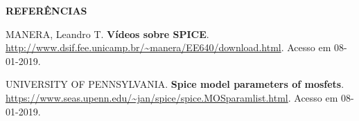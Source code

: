 \documentclass[addpoints]{exam}
\begin{document}
\begin{questions}
\vspace{5mm}

\textbf{REFERÊNCIAS}

\vspace{5mm}

MANERA, Leandro T. \textbf{Vídeos sobre SPICE}. \url{http://www.dsif.fee.unicamp.br/~manera/EE640/download.html}. Acesso em 08-01-2019.

UNIVERSITY OF PENNSYLVANIA. \textbf{Spice model parameters of mosfets}. \url{https://www.seas.upenn.edu/~jan/spice/spice.MOSparamlist.html}. Acesso em 08-01-2019.

\end{questions}
\end{document}
